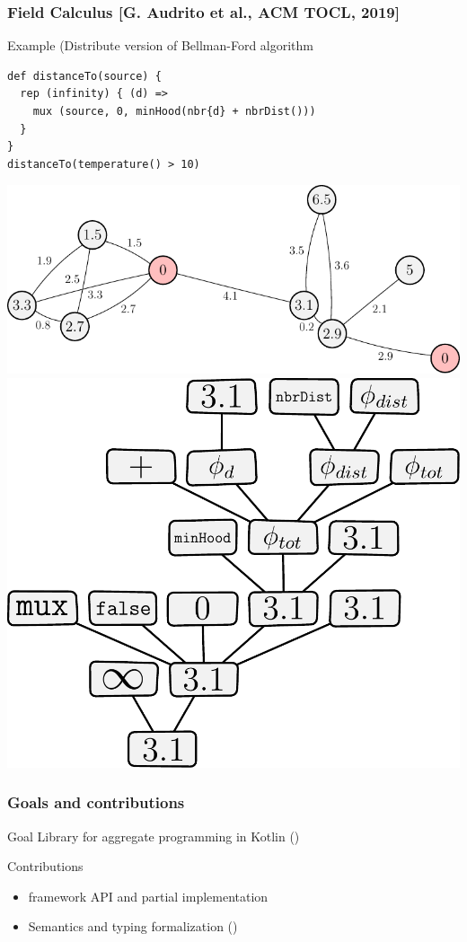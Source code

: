 \begin{frame}[fragile]
\frametitle{Field Calculus \small  [G. Audrito et al., ACM TOCL, 2019]}
	\begin{block}{Example (Distribute version of Bellman-Ford algorithm}
\begin{lstlisting}[]
def distanceTo(source) {
  rep (infinity) { (d) =>
    mux (source, 0, minHood(nbr{d} + nbrDist()))
  }
}
distanceTo(temperature() > 10)
\end{lstlisting}
\end{block}
\medskip
\includegraphics[width=0.65\linewidth]{imgs/gradient.pdf}
\includegraphics[width=0.3\linewidth]{imgs/valuetree.pdf}
\end{frame}

\begin{frame}
\frametitle{Goals and contributions}
\begin{block}{Goal}
Library for aggregate programming in Kotlin (\Kotac{})
\end{block}
\begin{block}{Contributions}
\begin{itemize}
\item \Kotac{} framework API and partial implementation
\item Semantics and typing formalization (\FKotac{})
\end{itemize}
\end{block}
\end{frame}

